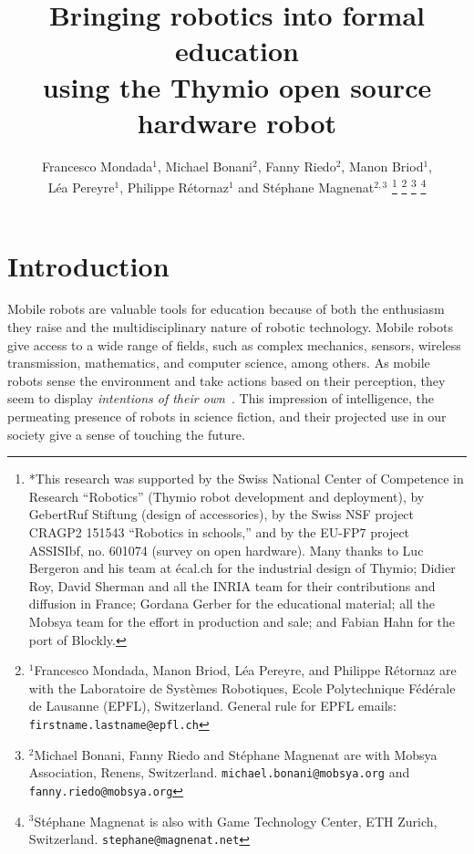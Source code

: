 \documentclass[letterpaper, 10 pt, conference]{ieeeconf}  %
\title{\LARGE \bf
Bringing robotics into formal education \\
using the Thymio open source hardware robot
}
\author{Francesco Mondada$^{1}$, Michael Bonani$^{2}$, Fanny Riedo$^{2}$, Manon Briod$^{1}$, \\
L\'ea Pereyre$^{1}$, Philippe R\'etornaz$^{1}$ and St\'ephane Magnenat$^{2,3}$%
\thanks{*This research was supported by the Swiss National Center of Competence in Research ``Robotics'' (Thymio robot development and deployment), by GebertRuf Stiftung (design of accessories), by the Swiss NSF project CRAGP2 151543 ``Robotics in schools,'' and by the EU-FP7 project ASSISIbf, no. 601074 (survey on open hardware).
Many thanks to Luc Bergeron and his team at \'ecal.ch for the industrial design of Thymio; Didier Roy, David Sherman and all the INRIA team for their contributions and diffusion in France; Gordana Gerber for the educational material; all the Mobsya team for the effort in production and sale; and Fabian Hahn for the port of Blockly.}%
\thanks{$^{1}$Francesco Mondada, Manon Briod, L\'ea Pereyre, and Philippe R\'etornaz are with the Laboratoire de Syst\`emes Robotiques,
        Ecole Polytechnique F\'ed\'erale de Lausanne (EPFL), Switzerland.
        {General rule for EPFL emails: \tt\small firstname.lastname@epfl.ch}}%
\thanks{$^{2}$Michael Bonani, Fanny Riedo and St\'ephane Magnenat are with Mobsya Association, Renens, Switzerland.
        {\tt\small michael.bonani@mobsya.org} and {\tt\small fanny.riedo@mobsya.org}}%
\thanks{$^{3}$St\'ephane Magnenat is also with Game Technology Center, ETH Zurich, Switzerland. 
        {\tt\small stephane@magnenat.net}}%
}
\begin{document}
\maketitle
\thispagestyle{empty}
\pagestyle{empty}





\section{Introduction}

Mobile robots are valuable tools for education because of both the enthusiasm they raise and the multidisciplinary nature of robotic technology.
Mobile robots give access to a wide range of fields, such as complex mechanics, sensors, wireless transmission, mathematics, and computer science, among others.
As mobile robots sense the environment and take actions based on their perception, they seem to display \emph{intentions of their own}~\cite{Mondada2001}.
This impression of intelligence, the permeating presence of robots in science fiction, and their projected use in our society give a sense of touching the future.
\end{document}
